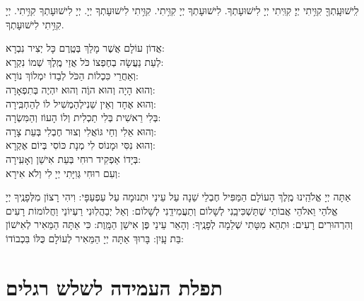 \documentclass[twoside, openany, parskip=half, 11pt]{book}
\begin{document}
לִֽישׁוּעָֽתְךָ֖
קִוִּ֥יתִי יְיָ׃ קִוִּֽיתִי יְיָ לִישׁוּעָתְךָ. לִישׁוּעָתְךָ יְיָ קִוִּ֥יתִי. קִוִּ֥יתִי לִישׁוּעָתְךָ יְיָ. יְיָ לִישׁוּעָתְךָ קִוִּ֥יתִי. יְיָ  קִוִּ֥יתִי לִישׁוּעָתְךָ.


אֲדוֹן עוֹלָם אֲשֶׁר מָלַךְ \hfill  בְּטֶֽרֶם כָּל יְצִיר נִבְרָא:\\
 לְעֵת נַעֲשָׂה בְחֶפְצוֹ כֹּל \hfill אֲזַי מֶֽלֶךְ שְׁמוֹ נִקְרָא:\\
  וְאַחֲרֵי כִּכְלוֹת הַכֹּל \hfill לְבַדוֹ יִמְלוֹךְ נוֹרָא:\\
   וְהוּא הָיָה וְהוּא הוֶֹה \hfill וְהוּא יִהְיֶה בְּתִפְאָרָה:\\
    וְהוּא אֶחָד וְאֵין שֵׁנִי\hfill לְהַמְשִׁיל לוֹ לְהַחְבִּֽירָה:\\
     בְּלִי רֵאשִׁית בְּלִי תַכְלִית \hfill וְלוֹ הָעוֹז וְהַמִּשְׂרָה:\\
      וְהוּא אֵלִי וְחַי גּוֹאֲלִי \hfill וְצוּר חֶבְלִי בְּעֵת צָרָה:\\
       וְהוּא נִסִּי וּמָנוֹס לִי \hfill מְנָת כּוֹסִי בְּיוֹם אֶקְרָא:\\
        בְּיָדוֹ אַפְקִיד רוּחִי \hfill בְּעֵת אִישַׁן וְאָעִֽירָה:\\
         וְעִם רוּחִי גְּוִיָּתִי \hfill יְיָ לִי וְלֹא אִירָא:

 אַתָּה יְיָ אֱלֹהֵֽינוּ מֶֽלֶךְ הָעוֹלָם הַמַּפִּיל חֶבְלֵי שֵׁנָה עַל עֵינַי וּתְנוּמָה עַל עַפְעַפָּי: וִיהִי רָצוֹן מִלְּפָנֶֽיךָ יְיָ אֱלֹהַי וֵאלֹהֵי אֲבוֹתַי שֶׁתַּשְׁכִּיבֵֽנִי לְשָׁלוֹם וְתַעֲמִידֵֽנִי לְשָׁלוֹם: וְאַל יְבַהֲלֽוּנִי רַעְיוֹנַי וַחֲלוֹמוֹת רָעִים וְהִרְהוּרִים רָעִים: וּתְהֵא מִטָּתִי שְׁלֵמָה לְפָנֶֽיךָ: וְהָאֵר עֵינַי פֶּן אִישַׁן הַמָּֽוֶת: כִּי אַתָּה הַמֵּאִיר לְאִישׁוֹן בַּת עָֽיִן: בָּרוּךְ אַתָּה יְיָ הַמֵּאִיר לְעוֹלָם כֻּלּוֹ בִּכְבוֹדוֹ:

\vfill

\sepline

\chapter[תפלת העמידה לשלש רגלים]{ תפלת העמידה לשלש רגלים }
\label{tefilasregel}

\specialsaavos

\specialsameisim

\end{document}

